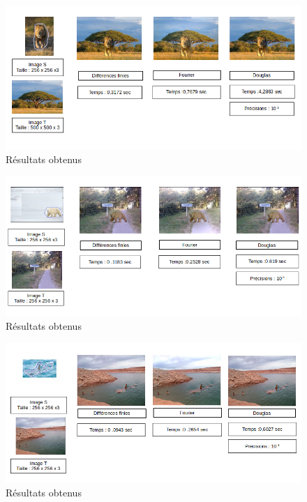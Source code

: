 \begin{figure}[H]
\centering
\includegraphics[scale=0.6]{Images/Resultats/3b.png}
\caption{Résultats obtenus}
\end{figure}

\begin{figure}[H]
\centering
\includegraphics[scale=0.6]{Images/Resultats/4b.png}
\caption{Résultats obtenus}
\end{figure}

\begin{figure}[H]
\centering
\includegraphics[scale=0.6]{Images/Resultats/5b.png}
\caption{Résultats obtenus}
\end{figure}

